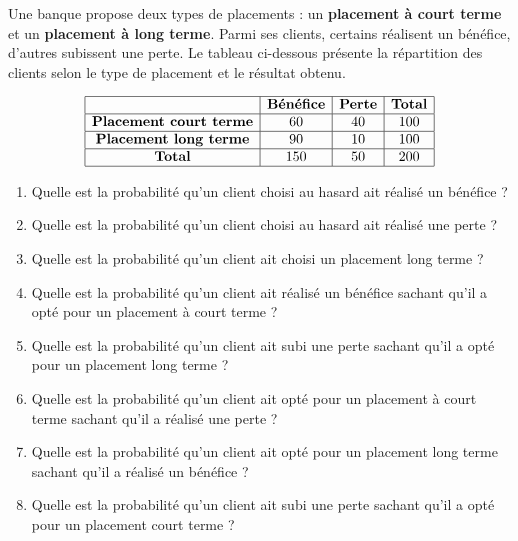 \documentclass[11pt]{article}
\begin{document}
\begin{exercice}
  Une banque propose deux types de placements : un \textbf{placement à
    court terme} et un \textbf{placement à long terme}. Parmi ses
  clients, certains réalisent un bénéfice, d'autres subissent une
  perte. Le tableau ci-dessous présente la répartition des clients
  selon le type de placement et le résultat obtenu.

  \[
    \begin{array}{|c|c|c|c|}
      \hline
      & \textbf{Bénéfice} & \textbf{Perte} & \textbf{Total} \\
      \hline
      \textbf{Placement court terme}  & 60 & 40 & 100 \\ \hline
      \textbf{Placement long terme}   & 90 & 10 & 100 \\ \hline
      \textbf{Total}                  & 150 & 50 & 200 \\
      \hline
    \end{array}
  \]

  \begin{multicols}{2}
    \begin{enumerate}
    \item Quelle est la probabilité qu'un client choisi au hasard ait
      réalisé un bénéfice ?
    \item Quelle est la probabilité qu'un client choisi au hasard ait
      réalisé une perte ?
    \item Quelle est la probabilité qu'un client ait choisi un
      placement long terme ?
    \item Quelle est la probabilité qu'un client ait réalisé un
      bénéfice sachant qu'il a opté pour un placement à court terme ?
    \item Quelle est la probabilité qu'un client ait subi une perte
      sachant qu'il a opté pour un placement long terme ?
    \item Quelle est la probabilité qu'un client ait opté pour un
      placement à court terme sachant qu'il a réalisé une perte ?
    \item Quelle est la probabilité qu'un client ait opté pour un
      placement long terme sachant qu'il a réalisé un bénéfice ?
    \item Quelle est la probabilité qu'un client ait subi une perte
      sachant qu'il a opté pour un placement court terme ?
    \end{enumerate}
  \end{multicols}
\end{exercice}
\end{document}
